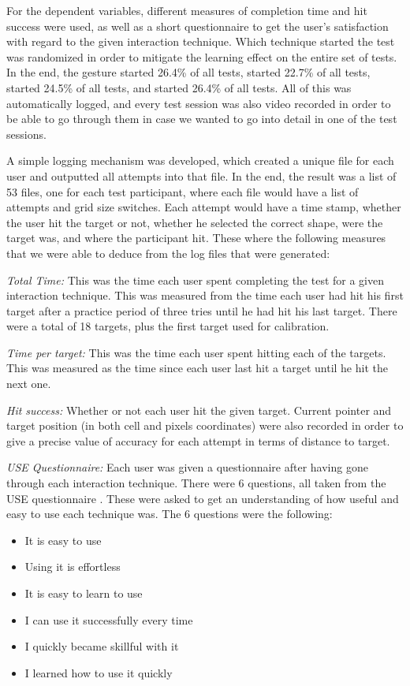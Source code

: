 For the dependent variables, different measures of completion time and hit success were used, as well as a short questionnaire to get the user's satisfaction with regard to the given interaction technique. 
Which technique started the test was randomized in order to mitigate the learning effect on the entire set of tests. 
In the end, the \pinch gesture started 26.4\% of all tests, \swipe started 22.7\% of all tests, \throw started 24.5\% of all tests, and \tilt started 26.4\% of all tests. 
All of this was automatically logged, and every test session was also video recorded in order to be able to go through them in case we wanted to go into detail in one of the test sessions.

A simple logging mechanism was developed, which created a unique file for each user and outputted all attempts into that file. In the end, the result was a list of 53 files, one for each test participant, where each file would have a list of attempts and grid size switches. Each attempt would have a time stamp, whether the user hit the target or not, whether he selected the correct shape, were the target was, and where the participant hit. These where the following measures that we were able to deduce from the log files that were generated: 

\textit{Total Time:} This was the time each user spent completing the test for a given interaction technique. 
This was measured from the time each user had hit his first target after a practice period of three tries until he had hit his last target. 
There were a total of 18 targets, plus the first target used for calibration. 

\textit{Time per target:} This was the time each user spent hitting each of the targets. 
This was measured as the time since each user last hit a target until he hit the next one.

\textit{Hit success:} Whether or not each user hit the given target. 
Current pointer and target position (in both cell and pixels coordinates) were also recorded in order to give a precise value of accuracy for each attempt in terms of distance to target. 

\textit{USE Questionnaire:} Each user was given a questionnaire after having gone through each interaction technique. 
There were 6 questions, all taken from the USE questionnaire \cite{lund2001measuring}. 
These were asked to get an understanding of how useful and easy to use each technique was. 
The 6 questions were the following: 

\begin{itemize}
	\item It is easy to use
	\item Using it is effortless
	\item It is easy to learn to use
	\item I can use it successfully every time
	\item I quickly became skillful with it
	\item I learned how to use it quickly
\end{itemize}

